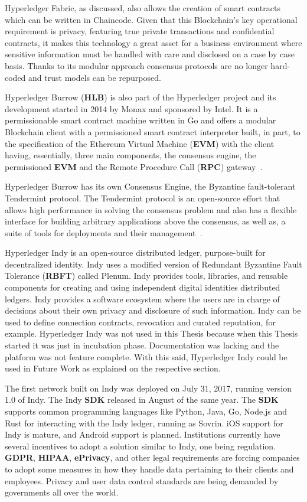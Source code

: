 Hyperledger Fabric, as discussed, also allows the creation of smart contracts
which can be written in Chaincode.  Given that this Blockchain's key
operational requirement is privacy, featuring true private transactions and
confidential contracts, it makes this technology a great asset for a business
environment where sensitive information must be handled with care and disclosed
on a case by case basis.  Thanks to its modular approach consensus protocols
are no longer hard-coded and trust models can be repurposed.

Hyperledger Burrow (\textbf{HLB}) is also part of the Hyperledger project and
its development started in 2014 by Monax and sponsored by Intel. It is a
permissionable smart contract machine written in Go and offers a modular
Blockchain client with a permissioned smart contract interpreter built, in
part, to the specification of the Ethereum Virtual Machine (\textbf{EVM}) with
the client having, essentially, three main components, the consensus engine,
the permissioned \textbf{EVM} and the Remote Procedure Call (\textbf{RPC})
gateway~\cite{Kuhlman2017,HyperledgerBurrow2017}.

Hyperledger Burrow has its own Consensus Engine, the Byzantine fault-tolerant
Tendermint protocol.  The Tendermint protocol is an open-source effort that
allows high performance in solving the consensus problem and also has a
flexible interface for building arbitrary applications above the consensus, as
well as, a suite of tools for deployments and their
management~\cite{Buchman2016}.

Hyperledger Indy is an open-source distributed ledger, purpose-built for
decentralized identity. Indy uses a modified version of Redundant Byzantine
Fault Tolerance (\textbf{RBFT}) called Plenum. Indy provides tools, libraries,
and reusable components for creating and using independent digital identities
distributed ledgers. Indy provides a software ecosystem where the users are in
charge of decisions about their own privacy and disclosure of such information.
Indy can be used to define connection contracts, revocation and curated
reputation, for example. Hyperledger Indy was not used in this Thesis because
when this Thesis started it was just in incubation phase. Documentation was
lacking and the platform was not feature complete. With this said, Hyperledger
Indy could be used in Future Work as explained on the respective section.

The first network built on Indy was deployed on July 31, 2017, running version
1.0 of Indy. The Indy \textbf{SDK} released in August of the same year. The
\textbf{SDK} supports common programming languages like Python, Java, Go,
Node.js and Rust for interacting with the Indy ledger, running as Sovrin. iOS
support for Indy is mature, and Android support is planned. Institutions
currently have several incentives to adopt a solution similar to Indy, one
being regulation. \textbf{GDPR}, \textbf{HIPAA}, \textbf{ePrivacy}, and other
legal requirements are forcing companies to adopt some measures in how they
handle data pertaining to their clients and employees. Privacy and user data
control standards are being demanded by governments all over the world.

